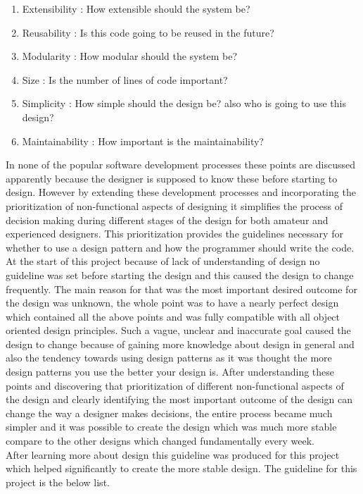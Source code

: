 \documentclass[10pt, a4paper, titlepage]{article}
\begin{document}
\begin{enumerate}
\item Extensibility : How extensible should the system be?
\item Reusability : Is this code going to be reused in the future?
\item Modularity : How modular should the system be?
\item Size : Is the number of lines of code important?
\item Simplicity : How simple should the design be? also who is going to use this design?
\item Maintainability : How important is the maintainability?
\end{enumerate}
In none of the popular software development processes these points are discussed apparently because the designer is supposed to know these before starting to design. However by extending these development processes and incorporating the prioritization of non-functional aspects of designing it simplifies the process of decision making during different stages of the design for both amateur and experienced designers. This prioritization provides the guidelines necessary for whether to use a design pattern and how the programmer should write the code.\\
At the start of this project because of lack of understanding of design no guideline was set before starting the design and this caused the design to change frequently. The main reason for that was the most important desired outcome for the design was unknown, the whole point was to have a nearly perfect design which contained all the above points and was fully compatible with all object oriented design principles. Such a vague, unclear and inaccurate goal caused the design to change because of gaining more knowledge about design in general and also the tendency towards using design patterns as it was thought the more design patterns you use the better your design is. After understanding these points and discovering that prioritization of different non-functional aspects of the design and clearly identifying the most important outcome of the design can change the way a designer makes decisions, the entire process became much simpler and it was possible to create the design which was much more stable compare to the other designs which changed fundamentally every week. \\
After learning more about design this guideline was produced for this project which helped significantly to create the more stable design. The guideline for this project is the below list.
\end{document}

